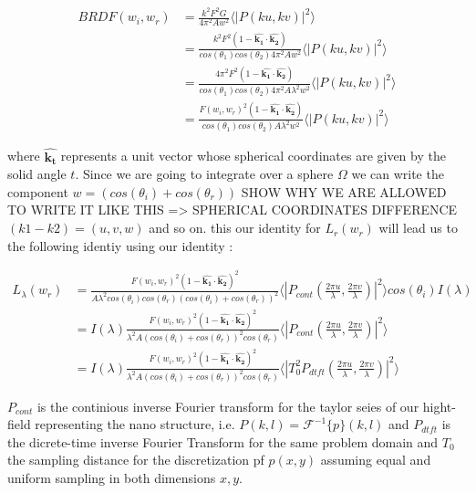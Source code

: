 \begin{align*}
BRDF(w_i, w_r) 
& = \frac{k^2 F^2 G}{4\pi^2 A w^2} \langle \left|P(ku, kv) \right|^2\rangle \\
& = \frac{k^2 F^2 (1-\hat{\mathbf{k_1}}\cdot\hat{\mathbf{k_2}})}{cos(\theta_1)cos(\theta_2) 4\pi^2 A w^2} \langle \left|P(ku, kv)  \right|^2\rangle \\
& = \frac{4 \pi^2 F^2 (1-\hat{\mathbf{k_1}}\cdot\hat{\mathbf{k_2}})}{cos(\theta_1)cos(\theta_2) 4\pi^2 A \lambda^2 w^2} \langle \left|P(ku, kv)  \right|^2\rangle \\
& = \frac{F(w_i, w_r)^2 (1-\hat{\mathbf{k_1}}\cdot\hat{\mathbf{k_2}})}{cos(\theta_1)cos(\theta_2) A \lambda^2 w^2} \langle \left|P(ku, kv)  \right|^2\rangle
\end{align*}

where $\hat{\mathbf{k_t}}$ represents a unit vector whose spherical coordinates are given by the solid angle $t$.
Since we are going to integrate over a sphere $\Omega$ we can write the component $w=(cos(\theta_i)+cos(\theta_r))$
SHOW WHY WE ARE ALLOWED TO WRITE IT LIKE THIS => SPHERICAL COORDINATES DIFFERENCE $(k1 - k2) = (u,v,w)$ and so on.
this our identity for $L_{r}(w_r)$ will lead us to the following identiy using our identity :

\begin{align*}
L_{\lambda}(w_r) 
& = \frac{F(w_i, w_r)^2 (1-\hat{\mathbf{k_1}}\cdot\hat{ \mathbf{k_2}})^2}{A \lambda^2 cos(\theta_i)cos(\theta_r)  (cos(\theta_i)+cos(\theta_r))^2} \langle \left|P_{cont}(\frac{2\pi u}{\lambda}, \frac{2\pi v}{\lambda})  \right|^2\rangle cos(\theta_i) I(\lambda) \\
& = I(\lambda) \frac{F(w_i, w_r)^2 (1-\hat{\mathbf{k_1}}\cdot\hat{\mathbf{k_2}})^2}{\lambda^2 A (cos(\theta_i)+cos(\theta_r))^2 cos(\theta_r)} \langle \left|P_{cont}(\frac{2\pi u}{\lambda}, \frac{2\pi v}{\lambda})  \right|^2\rangle \\
& = I(\lambda) \frac{F(w_i, w_r)^2 (1-\hat{\mathbf{k_1}}\cdot\hat{\mathbf{k_2}})^2}{\lambda^2 A (cos(\theta_i)+cos(\theta_r))^2 cos(\theta_r)} \langle \left|T_0^2 P_{dtft}(\frac{2\pi u}{\lambda}, \frac{2\pi v}{\lambda})  \right|^2\rangle
\end{align*}

$P_{cont}$ is the continious inverse Fourier transform for the taylor seies of our hight-field representing the nano structure, i.e. $P(k,l) = \mathcal{F}^{-1}\{p\}(k,l)$ and $P_{dtft}$ is the dicrete-time inverse Fourier Transform for the same problem domain and $T_0$ the sampling distance for the discretization pf $p(x,y)$ assuming equal and uniform sampling in both dimensions $x,y$.



